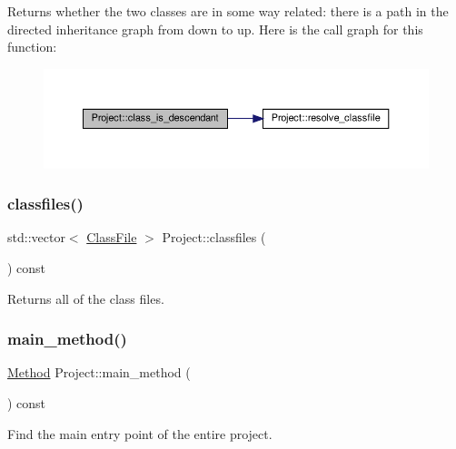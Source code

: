 Returns whether the two classes are in some way related\+: there is a path in the directed inheritance graph from down to up. Here is the call graph for this function\+:
\nopagebreak
\begin{figure}[H]
\begin{center}
\leavevmode
\includegraphics[width=350pt]{classProject_a6ef93527bbe86e9bdfbc6d624eab0834_cgraph}
\end{center}
\end{figure}
\mbox{\label{classProject_a74b0dfe1d19f11e859489922a8d277c7}} 
\subsubsection{\texorpdfstring{classfiles()}{classfiles()}}
{\footnotesize\ttfamily std\+::vector$<$ \hyperlink{classfile_8h_a00b46b60bc40e813e9fb1bb049174346}{Class\+File} $>$ Project\+::classfiles (\begin{DoxyParamCaption}{ }\end{DoxyParamCaption}) const}



Returns all of the class files. 

\mbox{\label{classProject_a8122de9e7b4bc2a63e1391727c881474}} 
\subsubsection{\texorpdfstring{main\+\_\+method()}{main\_method()}}
{\footnotesize\ttfamily \hyperlink{classMethod}{Method} Project\+::main\+\_\+method (\begin{DoxyParamCaption}{ }\end{DoxyParamCaption}) const}



Find the main entry point of the entire project. 

